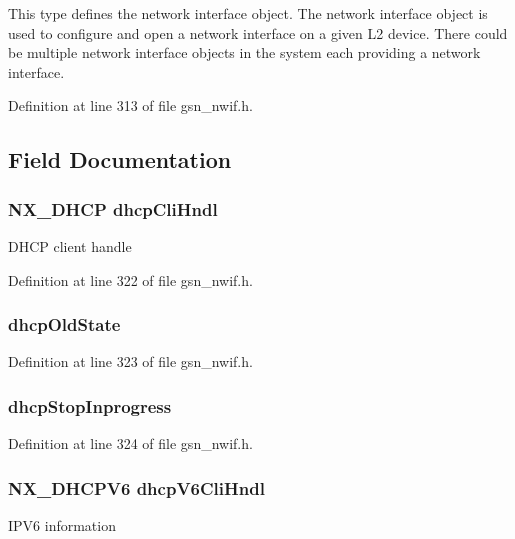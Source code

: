 This type defines the network interface object. The network interface object is used to configure and open a network interface on a given L2 device. There could be multiple network interface objects in the system each providing a network interface. 

Definition at line 313 of file gsn\_\-nwif.h.



\subsection{Field Documentation}
\hypertarget{a00167_aa0614deafcee66a6a87c2685279c82dc}{
\subsubsection[{dhcpCliHndl}]{\setlength{\rightskip}{0pt plus 5cm}NX\_\-DHCP {\bf dhcpCliHndl}}}
\label{a00167_aa0614deafcee66a6a87c2685279c82dc}
DHCP client handle 

Definition at line 322 of file gsn\_\-nwif.h.

\hypertarget{a00167_add3b061cbe3f42dca486ad19787820da}{
\subsubsection[{dhcpOldState}]{ {\bf dhcpOldState}}}
\label{a00167_add3b061cbe3f42dca486ad19787820da}


Definition at line 323 of file gsn\_\-nwif.h.

\hypertarget{a00167_a5e26015109e86651492607313559e708}{
\subsubsection[{dhcpStopInprogress}]{ {\bf dhcpStopInprogress}}}
\label{a00167_a5e26015109e86651492607313559e708}


Definition at line 324 of file gsn\_\-nwif.h.

\hypertarget{a00167_a82dbaba55c4ecc53e2da16b84515851d}{
\subsubsection[{dhcpV6CliHndl}]{\setlength{\rightskip}{0pt plus 5cm}NX\_\-DHCPV6 {\bf dhcpV6CliHndl}}}
\label{a00167_a82dbaba55c4ecc53e2da16b84515851d}
IPV6 information 

